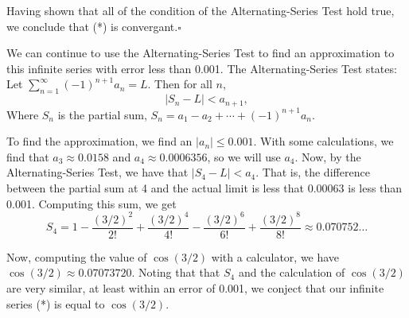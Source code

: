 \documentclass[12pt,letterpaper]{article}
\begin{document}
Having shown that all of the condition of the Alternating-Series Test hold true, we conclude that (*) is convergant.\hfill$\square$

We can continue to use the Alternating-Series Test to find an approximation to this infinite series with error less than 0.001. The Alternating-Series Test states: Let $\sum_{n=1}^{\infty}(-1)^{n+1} a_n = L$. Then for all $n$,
\[
|S_n - L| < a_{n+1},
\]
Where $S_n$ is the partial sum, $S_n = a_1 - a_2 + \cdots + (-1)^{n+1}a_n$.

To find the approximation, we find an $|a_n| \leq  0.001$. With some calculations, we find that $a_3 \approx 0.0158$ and $a_4\approx 0.0006356$, so we will use $a_4$. Now, by the Alternating-Series Test, we have that $|S_4 - L| < a_4$. That is, the difference between the partial sum at 4 and the actual limit is less that 0.00063 is less than 0.001. Computing this sum, we get
\[
S_4 = 1 - \frac{{(3/2)}^2}{2!} + \frac{{(3/2)}^4}{4!} - \frac{{(3/2)}^6}{6!} + \frac{{(3/2)}^8}{8!} \approx 0.070752\ldots
\]

Now, computing the value of $\cos(3/2)$ with a calculator, we have $\cos(3/2) \approx 0.07073720$. Noting that that $S_4$ and the calculation of $\cos(3/2)$ are very similar, at least within an error of 0.001, we conject that our infinite series (*) is equal to $\cos(3/2)$.




\end{document}

